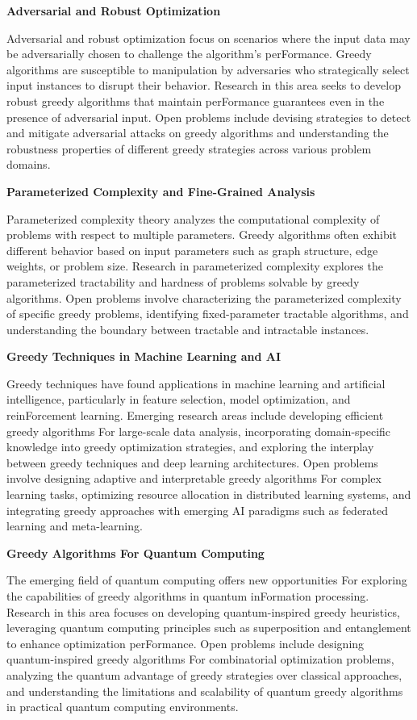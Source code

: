 \documentclass[12pt]{book} %
\begin{document}
\textbf{Adversarial and Robust Optimization}

Adversarial and robust optimization focus on scenarios where the input data may be adversarially chosen to challenge the algorithm's perFormance. Greedy algorithms are susceptible to manipulation by adversaries who strategically select input instances to disrupt their behavior. Research in this area seeks to develop robust greedy algorithms that maintain perFormance guarantees even in the presence of adversarial input. Open problems include devising strategies to detect and mitigate adversarial attacks on greedy algorithms and understanding the robustness properties of different greedy strategies across various problem domains.

\textbf{Parameterized Complexity and Fine-Grained Analysis}

Parameterized complexity theory analyzes the computational complexity of problems with respect to multiple parameters. Greedy algorithms often exhibit different behavior based on input parameters such as graph structure, edge weights, or problem size. Research in parameterized complexity explores the parameterized tractability and hardness of problems solvable by greedy algorithms. Open problems involve characterizing the parameterized complexity of specific greedy problems, identifying fixed-parameter tractable algorithms, and understanding the boundary between tractable and intractable instances.

\textbf{Greedy Techniques in Machine Learning and AI}

Greedy techniques have found applications in machine learning and artificial intelligence, particularly in feature selection, model optimization, and reinForcement learning. Emerging research areas include developing efficient greedy algorithms For large-scale data analysis, incorporating domain-specific knowledge into greedy optimization strategies, and exploring the interplay between greedy techniques and deep learning architectures. Open problems involve designing adaptive and interpretable greedy algorithms For complex learning tasks, optimizing resource allocation in distributed learning systems, and integrating greedy approaches with emerging AI paradigms such as federated learning and meta-learning.

\textbf{Greedy Algorithms For Quantum Computing}

The emerging field of quantum computing offers new opportunities For exploring the capabilities of greedy algorithms in quantum inFormation processing. Research in this area focuses on developing quantum-inspired greedy heuristics, leveraging quantum computing principles such as superposition and entanglement to enhance optimization perFormance. Open problems include designing quantum-inspired greedy algorithms For combinatorial optimization problems, analyzing the quantum advantage of greedy strategies over classical approaches, and understanding the limitations and scalability of quantum greedy algorithms in practical quantum computing environments.
\end{document}
